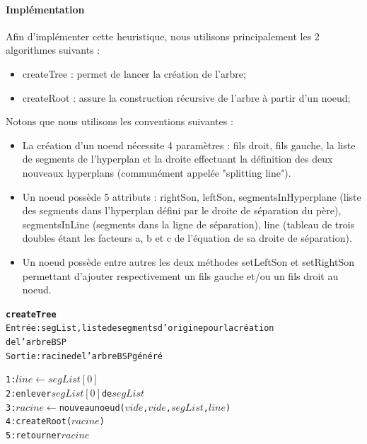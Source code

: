 \documentclass[11pt,a4paper]{article}
\begin{document}
\paragraph{Implémentation}

Afin d'implémenter cette heuristique, nous utilisons principalement les 2 algorithmes suivants :
\begin{itemize}
\item createTree : permet de lancer la création de l'arbre;
\item createRoot : assure la construction récursive de l'arbre à partir d'un noeud;
\end{itemize}

Notons que nous utilisons les conventions suivantes :
\begin{itemize}
\item La création d'un noeud nécessite 4 paramètres : fils droit, fils gauche, la liste de segments de l'hyperplan et la droite effectuant la définition des deux nouveaux hyperplans (communément appelée "splitting line").
\item Un noeud possède 5 attributs : rightSon, leftSon, segmentsInHyperplane (liste des segments dans l'hyperplan défini par le droite de séparation du père), segmentsInLine (segments dans la ligne de séparation), line (tableau de trois doubles étant les facteurs a, b et c de l'équation de sa droite de séparation).
\item Un noeud possède entre autres les deux méthodes setLeftSon et setRightSon permettant d'ajouter respectivement un fils gauche et/ou un fils droit au noeud. 
\end{itemize}

\begin{alltt}
\textbf{createTree}
Entrée : segList, liste de segments d'origine pour la création 
de l'arbre BSP
Sortie : racine de l'arbre BSP généré

1: \(line \leftarrow segList[0]\)
2: enlever \(segList[0]\) de \(segList\)
3: \(racine\) \(\leftarrow\) nouveau noeud (\(vide\), \(vide\), \(segList\), \(line\))
4: createRoot(\(racine\))
5: retourner \(racine\)
\end{alltt}
\end{document}
